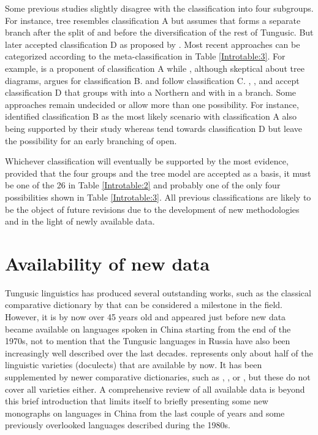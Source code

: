 \documentclass[output=paper,colorlinks,citecolor=brown]{langscibook}
\begin{document}
Some previous studies slightly disagree with the classification into four subgroups. For instance,  tree resembles classification A but assumes that  forms a separate branch after the split of  and before the diversification of the rest of Tungusic. But \citet[1103]{Vovin2009} later accepted classification D as proposed by \citet{Georg2004}. Most recent approaches can be categorized according to the meta-classification in Table \ref{Introtable:3}. For example, \citet{Robbeets2015} is a proponent of classification A while \citet{Doerfer1978}, although skeptical about tree diagrams, argues for classification B. \citet{Kazama2003} and \citet{Pevnov2017} follow classification C. \citet{Georg2004}, \citet{Janhunen2012a}, and  accept classification D that groups  with  into a Northern and  with  in a  branch. Some approaches remain undecided or allow more than one possibility. For instance, \citet[91]{WhaleyOskolskaya2020} identified classification B as the most likely scenario with classification A also being supported by their study whereas \citet{Oskolskayaetal2022} tend towards classification D but leave the possibility for an early branching of  open.

Whichever classification will eventually be supported by the most evidence, provided that the four groups and the tree model are accepted as a basis, it must be one of the 26 in Table \ref{Introtable:2} and probably one of the only four possibilities shown in Table \ref{Introtable:3}. All previous classifications are likely to be the object of future revisions due to the development of new methodologies and in the light of newly available data.

\section{Availability of new data}

Tungusic linguistics has produced several outstanding works, such as the classical comparative dictionary by \citet{Cincius1975} that can be considered a milestone in the field. However, it is by now over 45 years old and appeared just before new data became available on languages spoken in China starting from the end of the 1970s, not to mention that the Tungusic languages in Russia have also been increasingly well described over the last decades. \citet{Cincius1975} represents only about half of the linguistic varieties (doculects) that are available by now. It has been supplemented by newer comparative dictionaries, such as \citet{Kazama2003}, \citet{DoerferKnueppel2004}, or \citet{Chaoke2014}, but these do not cover all varieties either. A comprehensive review of all available data is beyond this brief introduction that limits itself to briefly presenting some new monographs on  languages in China from the last couple of years and some previously overlooked  languages described during the 1980s.
\end{document}
